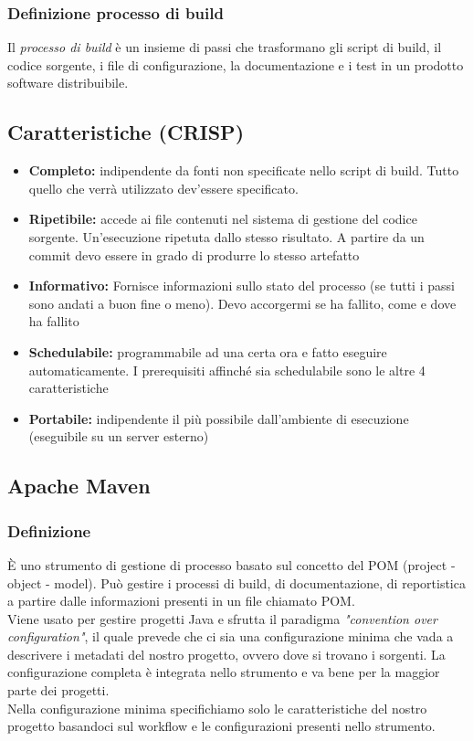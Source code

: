 \documentclass[10pt, a4paper]{article}
\begin{document}
\subsubsection*{Definizione processo di build}
Il \textit{processo di build} è un insieme di passi che trasformano gli script di build, il codice sorgente, i file di configurazione, la documentazione e i test in un prodotto software distribuibile.

\subsection{Caratteristiche (CRISP)}
\begin{itemize}
    \item \textbf{Completo:} indipendente da fonti non specificate nello script di build. Tutto quello che verrà utilizzato dev'essere specificato.
    \item \textbf{Ripetibile:} accede ai file contenuti nel sistema di gestione del codice sorgente. Un'esecuzione ripetuta dallo stesso risultato. A partire da un commit devo essere in grado di produrre lo stesso artefatto
    \item \textbf{Informativo:} Fornisce informazioni sullo stato del processo (se tutti i passi sono andati a buon fine o meno). Devo accorgermi se ha fallito, come e dove ha fallito
    \item \textbf{Schedulabile:} programmabile ad una certa ora e fatto eseguire automaticamente. I prerequisiti affinché sia schedulabile sono le altre 4 caratteristiche
    \item \textbf{Portabile:} indipendente il più possibile dall'ambiente di esecuzione (eseguibile su un server esterno)
\end{itemize}

\subsection{Apache Maven}
\subsubsection{Definizione}
È uno strumento di gestione di processo basato sul concetto del POM (project - object - model). Può gestire i processi di build, di documentazione, di reportistica a partire dalle informazioni presenti in un file chiamato POM.\\
Viene usato per gestire progetti Java e sfrutta il paradigma \textit{"convention over configuration"}, il quale prevede che ci sia una configurazione minima che vada a descrivere i metadati del nostro progetto, ovvero dove si trovano i sorgenti. La configurazione completa è integrata nello strumento e va bene per la maggior parte dei progetti.\\
Nella configurazione minima specifichiamo solo le caratteristiche del nostro progetto basandoci sul workflow e le configurazioni presenti nello strumento.
\end{document}
